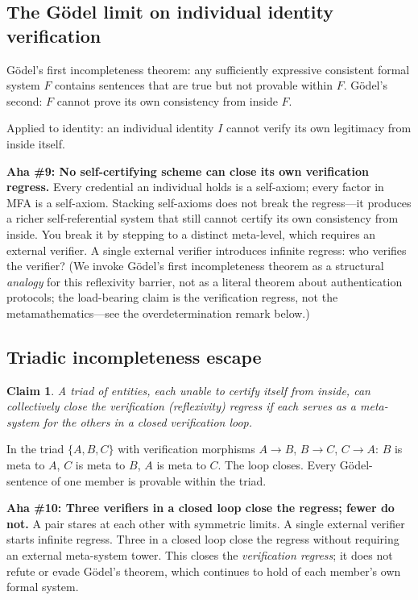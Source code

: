 \documentclass[11pt,a4paper]{article}
\newtheorem{claim}{Claim}
\theoremstyle{definition}
\theoremstyle{remark}
\newcommand{\aha}[2]{\medskip\textbf{Aha \##1: #2}}
\begin{document}
\subsection{The G\"odel limit on individual identity verification}

G\"odel's first incompleteness theorem: any sufficiently expressive consistent formal system $F$ contains sentences that are true but not provable within $F$. G\"odel's second: $F$ cannot prove its own consistency from inside $F$.

Applied to identity: an individual identity $I$ cannot verify its own legitimacy from inside itself.

\aha{9}{No self-certifying scheme can close its own verification regress.} Every credential an individual holds is a self-axiom; every factor in MFA is a self-axiom. Stacking self-axioms does not break the regress---it produces a richer self-referential system that still cannot certify its own consistency from inside. You break it by stepping to a distinct meta-level, which requires an external verifier. A single external verifier introduces infinite regress: who verifies the verifier? (We invoke G\"odel's first incompleteness theorem as a structural \emph{analogy} for this reflexivity barrier, not as a literal theorem about authentication protocols; the load-bearing claim is the verification regress, not the metamathematics---see the overdetermination remark below.)

\subsection{Triadic incompleteness escape}

\begin{claim}
A triad of entities, each unable to certify itself from inside, can collectively close the verification (reflexivity) regress if each serves as a meta-system for the others in a closed verification loop.
\end{claim}

In the triad $\{A, B, C\}$ with verification morphisms $A \to B$, $B \to C$, $C \to A$: $B$ is meta to $A$, $C$ is meta to $B$, $A$ is meta to $C$. The loop closes. Every G\"odel-sentence of one member is provable within the triad.

\aha{10}{Three verifiers in a closed loop close the regress; fewer do not.} A pair stares at each other with symmetric limits. A single external verifier starts infinite regress. Three in a closed loop close the regress without requiring an external meta-system tower. This closes the \emph{verification regress}; it does not refute or evade G\"odel's theorem, which continues to hold of each member's own formal system.
\end{document}
